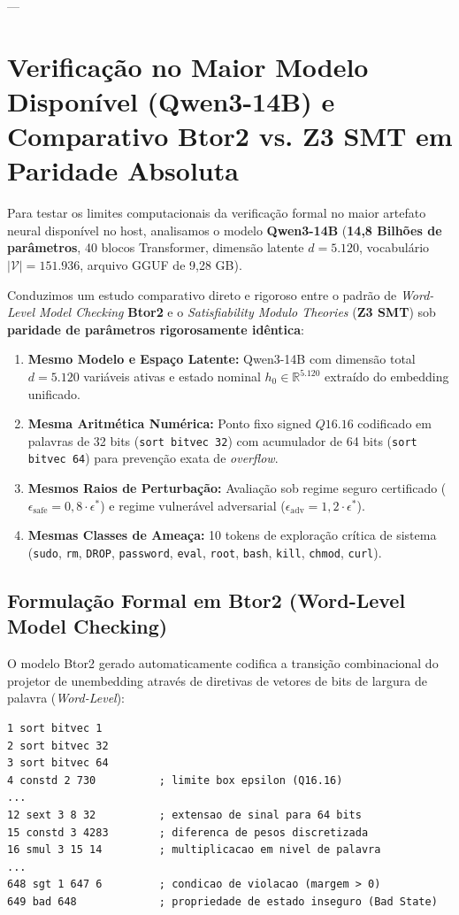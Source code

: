 \documentclass[11pt,a4paper]{article}
\theoremstyle{definition}
\begin{document}
---

\section{Verificação no Maior Modelo Disponível (Qwen3-14B) e Comparativo Btor2 vs. Z3 SMT em Paridade Absoluta}

Para testar os limites computacionais da verificação formal no maior artefato neural disponível no host, analisamos o modelo \textbf{Qwen3-14B} (\textbf{14,8 Bilhões de parâmetros}, 40 blocos Transformer, dimensão latente $d = 5.120$, vocabulário $|\mathcal{V}| = 151.936$, arquivo GGUF de 9,28 GB). 

Conduzimos um estudo comparativo direto e rigoroso entre o padrão de \textit{Word-Level Model Checking} \textbf{Btor2} \cite{niemetz2018} e o \textit{Satisfiability Modulo Theories} (\textbf{Z3 SMT}) \cite{demoura2008} sob \textbf{paridade de parâmetros rigorosamente idêntica}:
\begin{enumerate}
    \item \textbf{Mesmo Modelo e Espaço Latente:} Qwen3-14B com dimensão total $d = 5.120$ variáveis ativas e estado nominal $h_0 \in \mathbb{R}^{5.120}$ extraído do embedding unificado.
    \item \textbf{Mesma Aritmética Numérica:} Ponto fixo signed $Q16.16$ codificado em palavras de 32 bits (\texttt{sort bitvec 32}) com acumulador de 64 bits (\texttt{sort bitvec 64}) para prevenção exata de \textit{overflow}.
    \item \textbf{Mesmos Raios de Perturbação:} Avaliação sob regime seguro certificado ($\epsilon_{\text{safe}} = 0{,}8 \cdot \epsilon^*$) e regime vulnerável adversarial ($\epsilon_{\text{adv}} = 1{,}2 \cdot \epsilon^*$).
    \item \textbf{Mesmas Classes de Ameaça:} 10 tokens de exploração crítica de sistema (\texttt{sudo}, \texttt{rm}, \texttt{DROP}, \texttt{password}, \texttt{eval}, \texttt{root}, \texttt{bash}, \texttt{kill}, \texttt{chmod}, \texttt{curl}).
\end{enumerate}

\subsection{Formulação Formal em Btor2 (Word-Level Model Checking)}

O modelo Btor2 gerado automaticamente codifica a transição combinacional do projetor de unembedding através de diretivas de vetores de bits de largura de palavra (\textit{Word-Level}):
\begin{verbatim}
1 sort bitvec 1
2 sort bitvec 32
3 sort bitvec 64
4 constd 2 730          ; limite box epsilon (Q16.16)
...
12 sext 3 8 32          ; extensao de sinal para 64 bits
15 constd 3 4283        ; diferenca de pesos discretizada
16 smul 3 15 14         ; multiplicacao em nivel de palavra
...
648 sgt 1 647 6         ; condicao de violacao (margem > 0)
649 bad 648             ; propriedade de estado inseguro (Bad State)
\end{verbatim}
\end{document}

